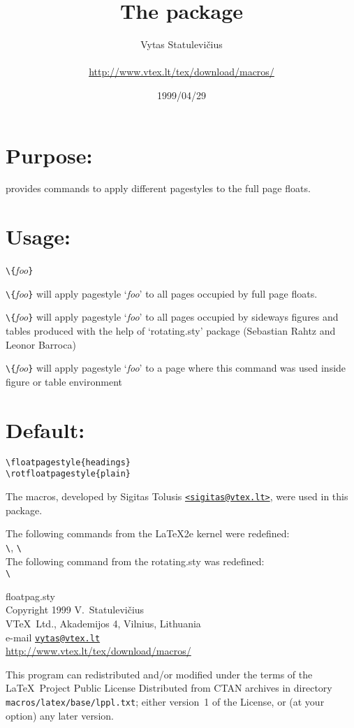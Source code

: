 \documentclass[DIV=8, parskip=half, pagesize=auto]{scrartcl}
\title{The \pkg{floatpag} package}
\author{Vytas Statulevičius\\\mail{vytas@vtex.lt}\\\url{http://www.vtex.lt/tex/download/macros/}}
\date{1999/04/29}
\makeatletter
\newcommand*{\mail}[1]{\href{mailto:#1}{\texttt{#1}}}
\newcommand*{\Mail}[1]{\href{mailto:#1}{\texttt{<#1>}}}
\newcommand*{\pkg}[1]{\textsf{#1}}
\newcommand*{\cs}[1]{\texttt{\textbackslash#1}}
\newcommand*{\cmd}[1]{\cs{\expandafter\@gobble\string#1}}
\newcommand*{\meta}[1]{\textlangle\textsl{#1}\textrangle}
\newcommand*{\marg}[1]{\texttt{\{}\meta{#1}\texttt{\}}}
\makeatother
\begin{document}
\maketitle

\section{Purpose:}

provides commands to apply different pagestyles
to the full page floats.


\section{Usage:}

\begin{labeling}{\cmd{\thisfloatpagestyle}\marg{foo}}
\item[\cmd{\floatpagestyle}\marg{foo}] will apply pagestyle
  `\meta{foo}' to all pages occupied by full page floats.
\item[\cmd{\rotfloatpagestyle}\marg{foo}] will apply pagestyle `\meta{foo}'
  to all pages occupied by sideways figures and tables produced with
  the help of `\pkg{rotating.sty}' package (Sebastian Rahtz and Leonor
  Barroca)
\item[\cmd{\thisfloatpagestyle}\marg{foo}] will apply pagestyle
  `\meta{foo}' to a page where this command was used inside figure or
  table environment
\end{labeling}


\section{Default:}

\begin{verbatim}
\floatpagestyle{headings}
\rotfloatpagestyle{plain}
\end{verbatim}

\medskip
The macros, developed by Sigitas Tolusis \Mail{sigitas@vtex.lt},
were used in this package.

The following commands from the LaTeX2e kernel were redefined:\\
\cmd{\@xfloat}, \cmd{\@vtryfc}\\
The following command from the rotating.sty  was redefined:\\
\cmd{\@xrotfloat}

\bigskip
\footnotesize
\pkg{floatpag.sty}\\
Copyright 1999 V.\ Statulevičius\\
V\TeX\ Ltd., Akademijos 4, Vilnius, Lithuania\\
e-mail \mail{vytas@vtex.lt}\\
\url{http://www.vtex.lt/tex/download/macros/}

This program can redistributed and/or modified under the terms
of the \LaTeX\ Project Public License Distributed from CTAN
archives in directory \texttt{macros/latex/base/lppl.txt}; either
version~1 of the License, or (at your option) any later version.
\end{document}
